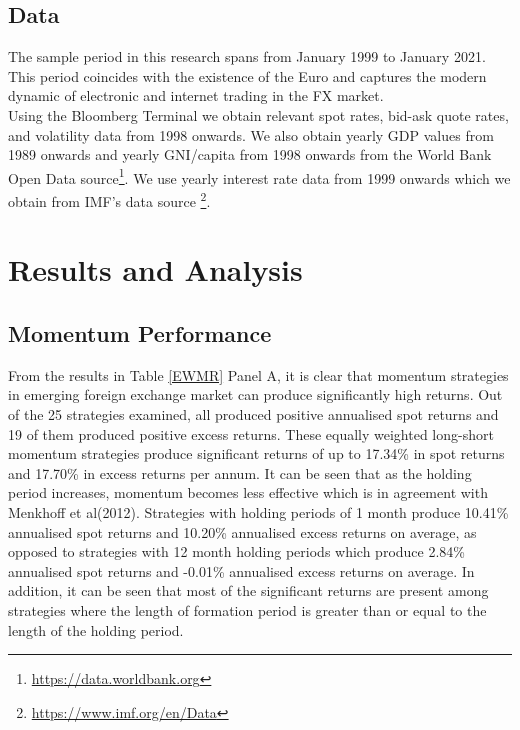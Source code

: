 \documentclass{article}
\begin{document}
\subsection{Data}
The sample period in this research spans from January 1999 to January 2021. This period coincides with the existence of the Euro and captures the modern dynamic of electronic and internet trading in the FX market.\\


Using the Bloomberg Terminal we obtain relevant spot rates, bid-ask quote rates, and volatility data from 1998 onwards. We also obtain yearly GDP values from 1989 onwards and yearly GNI/capita from 1998 onwards from the World Bank Open Data source\footnote{\url{https://data.worldbank.org}}. We use yearly interest rate data from 1999 onwards which we obtain from IMF’s data source \footnote{\url{https://www.imf.org/en/Data}}. \\

\newpage

\section{Results and Analysis}
\subsection{Momentum Performance}

From the results in Table \ref{EWMR} Panel A, it is clear that momentum strategies in emerging foreign exchange market can produce significantly high returns. Out of the 25 strategies examined, all produced positive annualised spot returns and 19 of them produced positive excess returns. These equally weighted long-short momentum strategies produce significant returns of up to 17.34\% in spot returns and 17.70\% in excess returns per annum. It can be seen that as the holding period increases, momentum becomes less effective which is in agreement with Menkhoff et al(2012).  Strategies with holding periods of 1 month produce 10.41\% annualised spot returns and 10.20\% annualised excess returns on average, as opposed to strategies with 12 month holding periods which produce 2.84\% annualised spot returns and -0.01\% annualised excess returns on average. In addition, it can be seen that most of the significant returns are present among strategies where the length of formation period is greater than or equal to the length of the holding period.\\
\end{document}
